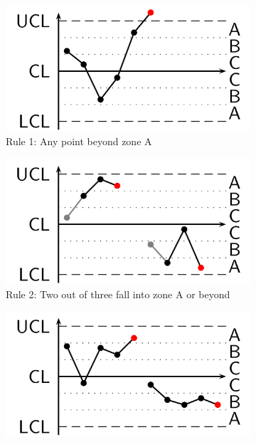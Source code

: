 \documentclass[11pt]{article}
\theoremstyle{definition}
\begin{document}
\begin{figure}[htb]
	\begin{subfigure}{0.45\linewidth}
		\includegraphics[width=\linewidth]{img/western_electric_rule1.png}
		\caption{Rule 1: Any point beyond zone A}
	\end{subfigure}
	\hfill
	\begin{subfigure}{0.45\linewidth}
		\includegraphics[width=\linewidth]{img/western_electric_rule2.png}
		\caption{Rule 2: Two out of three fall into zone A or beyond}
	\end{subfigure}
	\begin{subfigure}{0.45\linewidth}
		\includegraphics[width=\linewidth]{img/western_electric_rule3.png}

\end{subfigure}
\end{figure}
\end{document}
